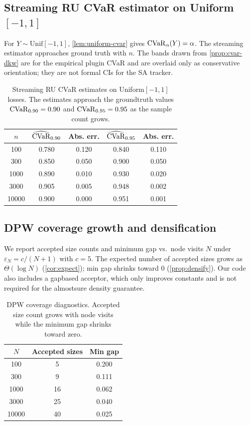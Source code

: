 \subsection{\texorpdfstring{Streaming RU CVaR estimator on Uniform$[-1,1]$}{Streaming RU CVaR estimator on Uniform[-1,1]}}
For $Y\sim \mathrm{Unif}[-1,1]$, \cref{lem:uniform-cvar} gives $\mathrm{CVaR}_\alpha(Y)=\alpha$. The streaming estimator approaches ground truth with $n$. The bands drawn from \cref{prop:cvar-dkw} are for the empirical plug\textendash in CVaR and are overlaid only as conservative orientation; they are not formal CIs for the SA tracker.

\begin{table}[t]
\centering
\begin{tabular}{ccccc}
\toprule
$n$ & $\widehat{\mathrm{CVaR}}_{0.90}$ & Abs. err. & $\widehat{\mathrm{CVaR}}_{0.95}$ & Abs. err. \\
\midrule
100 & 0.780 & 0.120 & 0.840 & 0.110 \\
300 & 0.850 & 0.050 & 0.900 & 0.050 \\
1000 & 0.890 & 0.010 & 0.930 & 0.020 \\
3000 & 0.905 & 0.005 & 0.948 & 0.002 \\
10000 & 0.900 & 0.000 & 0.951 & 0.001 \\
\bottomrule
\end{tabular}
\caption{Streaming RU CVaR estimates on Uniform$[-1,1]$ losses. The estimates approach the ground\textendash truth values $\mathrm{CVaR}_{0.90}=0.90$ and $\mathrm{CVaR}_{0.95}=0.95$ as the sample count grows.}
\label{tab:cvar}
\end{table}

\subsection{DPW coverage growth and densification}
We report accepted size counts and minimum gap vs.\ node visits $N$ under $\varepsilon_N=c/(N+1)$ with $c=5$. The expected number of accepted sizes grows as $\Theta(\log N)$ (\cref{cor:expect}); min gap shrinks toward 0 (\cref{prop:densify}). Our code also includes a gap\textendash based acceptor, which only improves constants and is not required for the almost\textendash sure density guarantee.

\begin{table}[t]
\centering
\begin{tabular}{ccc}
\toprule
$N$ & Accepted sizes & Min gap \\
\midrule
100 & 5 & 0.200 \\
300 & 9 & 0.111 \\
1000 & 16 & 0.062 \\
3000 & 25 & 0.040 \\
10000 & 40 & 0.025 \\
\bottomrule
\end{tabular}
\caption{DPW coverage diagnostics. Accepted size count grows with node visits while the minimum gap shrinks toward zero.}
\label{tab:dpw}
\end{table}

